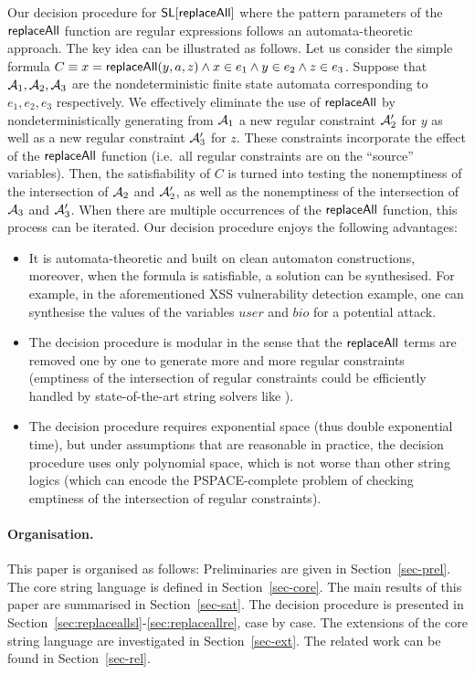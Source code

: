 Our decision procedure for $\mathsf{SL}[\mathsf{replaceAll}]$ where the pattern parameters
of the $\mathsf{replaceAll}$ function are regular expressions follows an 
automata-theoretic approach. The key idea can be illustrated as follows. Let 
us consider the simple formula $C \equiv x = \mathsf{replaceAll}(y, a, z) \wedge x \in e_1 \wedge y \in e_2 \wedge z \in e_3$. 
Suppose that $\mathcal{A}_1,\mathcal{A}_2,\mathcal{A}_3$ are the nondeterministic finite state automata corresponding to $e_1,e_2,e_3$ respectively. 
We effectively eliminate the use of $\mathsf{replaceAll}$ by nondeterministically
generating from $\mathcal{A}_1$ a new regular constraint $\mathcal{A}'_2$ for $y$ as well as a new regular constraint
$\mathcal{A}'_3$ for $z$.   These constraints incorporate the effect of the
$\mathsf{replaceAll}$ function (i.e.\ all regular constraints are on the ``source'' variables).
Then, the satisfiability of $C$ is turned into testing the nonemptiness of the intersection of $\mathcal{A}_2$ and $\mathcal{A}'_2$, as well as the nonemptiness of the intersection of $\mathcal{A}_3$ and $\mathcal{A}'_3$. When there are multiple occurrences of the $\mathsf{replaceAll}$ function, this process can be iterated. 
Our decision procedure enjoys the following advantages:
\begin{itemize}
	\item It is automata-theoretic and built on clean automaton constructions, 
        moreover, when the formula is satisfiable, a solution can be 
        synthesised. For example, in the aforementioned XSS vulnerability detection example, one can synthesise the values of the variables $user$ and $bio$ for a potential attack. 
	\item The decision procedure is modular in
        the sense that the $\mathsf{replaceAll}$ terms are removed one by one to
        generate more and more regular constraints (emptiness of the
        intersection of regular constraints could be efficiently handled by
        state-of-the-art string solvers like \cite{fang-yu-circuits}).  
    \item The decision procedure requires exponential space (thus double
        exponential time), but under assumptions that are reasonable in practice, 
        the decision procedure uses only polynomial space, which is not
        worse than other string logics (which can encode the PSPACE-complete
        problem of checking emptiness of the intersection of regular 
        constraints). 
\end{itemize}


%


\paragraph{Organisation.} 
This paper is organised as follows: Preliminaries are given in Section~\ref{sec-prel}. The core string language is defined in Section~\ref{sec-core}. The main results of this paper are summarised in Section~\ref{sec-sat}. The decision procedure is presented in Section~\ref{sec:replaceallsl}-\ref{sec:replaceallre}, case by case. The extensions of the core string language are investigated in Section~\ref{sec-ext}. The related work can be found in Section~\ref{sec-rel}.
